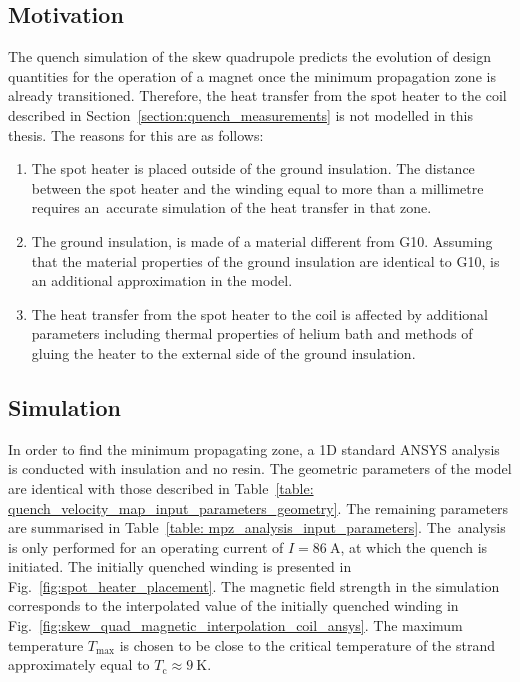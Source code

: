 
\subsection{Motivation}

The quench simulation of the skew quadrupole predicts the evolution of design quantities for the operation of a magnet once the minimum propagation zone is already transitioned. Therefore, the heat transfer from the spot heater to the coil described in Section~\ref{section:quench_measurements} is not modelled in this thesis. The reasons for this are as follows: 

\begin{enumerate}
    \item The spot heater is placed outside of the ground insulation. The distance between the spot heater and the winding equal to more than a millimetre requires an~accurate simulation of the heat transfer in that zone. 
    \item The ground insulation, is made of a material different from G10. Assuming that the material properties of the ground insulation are identical to G10, is an additional approximation in the model. 
    \item The heat transfer from the spot heater to the coil is affected by additional parameters including thermal properties of helium bath and methods of gluing the heater to the external side of the ground insulation.
\end{enumerate}

\subsection{Simulation}

In order to find the minimum propagating zone, a 1D standard ANSYS analysis is conducted with insulation and no resin. The geometric parameters of the model are identical with those described in Table~\ref{table: quench_velocity_map_input_parameters_geometry}. The remaining parameters are summarised in Table~\ref{table: mpz_analysis_input_parameters}. The~analysis is only performed for an operating current of $I=86~\text{A}$, at which the quench is initiated. The initially quenched winding is presented in Fig.~\ref{fig:spot_heater_placement}. The magnetic field strength in the simulation corresponds to the interpolated value of the initially quenched winding in Fig.~\ref{fig:skew_quad_magnetic_interpolation_coil_ansys}. The maximum temperature $T_\text{max}$ is chosen to be close to the critical temperature of the strand approximately equal to $T_\text{c} \approx 9~\text{K}$.

